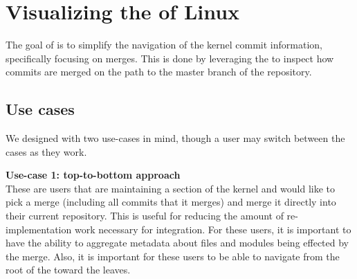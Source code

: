\documentclass[draft]{IEEEtran}
\begin{document}
\title{\TheTitle}

\author{
        \IEEEauthorblockA{\TheAuthors}
}
\maketitle

\begin{abstract}

  

\end{abstract}


\begin{IEEEkeywords}
  \TheKeywords
\end{IEEEkeywords}



\label{sec:background}






\section{Visualizing the \mt of Linux}

The goal of \tool is to simplify the navigation of the kernel commit
information, specifically focusing on merges. This is done by leveraging
the \mt to inspect how commits are merged on the path to the
master branch of the repository.

\subsection{Use cases}

We designed \tool with two use-cases in mind, though a user may switch
between the cases as they work.

\noindent \textbf{Use-case 1: top-to-bottom approach}
\label{sec:usecase1}\\ These are users that are maintaining a section of
the kernel and would like to pick a merge (including all commits that it
merges) and merge it directly into their current repository. This is
useful for reducing the amount of re-implementation work necessary for
integration. For these users, it is important to have the ability to
aggregate metadata about files and modules being effected by the merge.
Also, it is important for these users to be able to navigate from the
root of the \mt toward the leaves.
\end{document}
